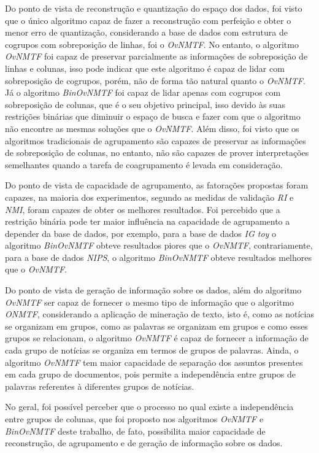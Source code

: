 \documentclass[
    12pt,                %
    oneside,            %
    a4paper,            %
    english,            %
    brazil                %
    ]{abntex2ppgsi}
\begin{document}
Do ponto de vista de reconstrução e quantização do espaço dos dados, foi visto que o único algoritmo capaz de fazer a reconstrução com perfeição e obter o menor erro de quantização, considerando a base de dados com estrutura de cogrupos com sobreposição de linhas, foi o \textit{OvNMTF}.
No entanto, o algoritmo \textit{OvNMTF} foi capaz de preservar parcialmente as informações de sobreposição de linhas e colunas, isso pode indicar que este algoritmo é capaz de lidar com sobreposição de cogrupos, porém, não de forma tão natural quanto o \textit{OvNMTF}.
Já o algoritmo \textit{BinOvNMTF} foi capaz de lidar apenas com cogrupos com sobreposição de colunas, que é o seu objetivo principal, isso devido às suas restrições binárias que diminuir o espaço de busca e fazer com que o algoritmo não encontre as mesmas soluções que o \textit{OvNMTF}.
Além disso, foi visto que os algoritmos tradicionais de agrupamento são capazes de preservar as informações de sobreposição de colunas, no entanto, não são capazes de prover interpretações semelhantes quando a tarefa de coagrupamento é levada em consideração.

Do ponto de vista de capacidade de agrupamento, as fatorações propostas foram capazes, na maioria dos experimentos, segundo as medidas de validação \textit{RI} e \textit{NMI}, foram capazes de obter os melhores resultados.
Foi percebido que a restrição binária pode ter maior influência na capacidade de agrupamento a depender da base de dados, por exemplo, para a base de dados \textit{IG toy} o algoritmo \textit{BinOvNMTF} obteve resultados piores que o \textit{OvNMTF}, contrariamente, para a base de dados \textit{NIPS}, o algoritmo \textit{BinOvNMTF} obteve resultados melhores que o \textit{OvNMTF}.

Do ponto de vista de geração de informação sobre os dados, além do algoritmo \textit{OvNMTF} ser capaz de fornecer o mesmo tipo de informação que o algoritmo \textit{ONMTF}, considerando a aplicação de mineração de texto, isto é, como as notícias se organizam em grupos, como as palavras se organizam em grupos e como esses grupos se relacionam, o algoritmo \textit{OvNMTF} é capaz de fornecer a informação de cada grupo de notícias se organiza em termos de grupos de palavras.
Ainda, o algoritmo \textit{OvNMTF} tem maior capacidade de separação dos assuntos presentes em cada grupo de documentos, pois permite a independência entre grupos de palavras referentes à diferentes grupos de notícias.

No geral, foi possível perceber que o processo no qual existe a independência entre grupos de colunas, que foi proposto nos algoritmos \textit{OvNMTF} e \textit{BinOvNMTF} deste trabalho, de fato, possibilita maior capacidade de reconstrução, de agrupamento e de geração de informação sobre os dados.
\end{document}

